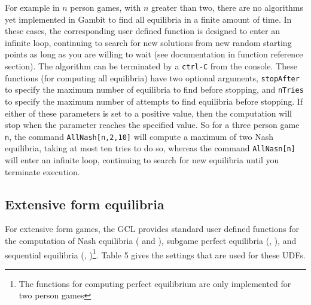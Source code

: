 For example in $n$ person games, with $n$ greater than two, there are
no algorithms yet implemented in Gambit to find all equilibria in a
finite amount of time.  In these cases, the corresponding user defined
function is designed to enter an infinite loop, continuing to search
for new solutions from new random starting points as long as you are
willing to wait (see documentation in function reference section).
The algorithm can be terminated by a \verb+ctrl-C+ from the console.
These functions (for computing all equilibria) have two optional
arguments, \verb+stopAfter+ to specify the maximum number of
equilibria to find before stopping, and \verb+nTries+ to specify the
maximum number of attempts to find equilibria before stopping. If
either of these parameters is set to a positive value, then the
computation will stop when the parameter reaches the specified value.
So for a three person game \verb+n+, the command
\verb+AllNash[n,2,10]+ will compute a maximum of two Nash equilibria,
taking at most ten tries to do so, whereas the command
\verb+AllNasn[n]+ will enter an infinite loop, continuing to search
for new equilibria until you terminate execution.

\subsection{Extensive form equilibria}

For extensive form games, the GCL provides standard user defined
functions for the computation of Nash equilibria ( and ), subgame perfect
equilibria (, ), and sequential
equilibria (,
)\footnote{The functions for computing perfect
equilibrium are only implemented for two person games}.  Table 5 gives
the settings that are used for these UDFs.  

